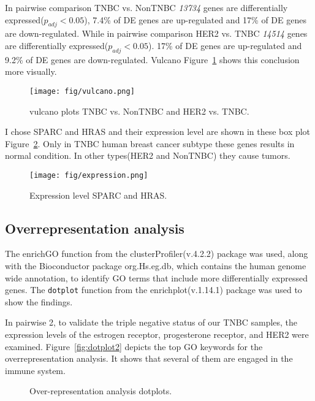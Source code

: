 \documentclass[onecolumn]{article}
\begin{document}
In pairwise comparison TNBC vs. NonTNBC \emph{13734} genes are differentially expressed($p_{adj} < 0.05$), 7.4\% of DE genes are up-regulated and 17\% of DE genes are down-regulated.
While in pairwise comparison HER2 vs. TNBC \emph{14514} genes are differentially expressed($p_{adj} < 0.05$).  17\% of DE genes are up-regulated and 9.2\% of DE genes are down-regulated. Vulcano Figure~\ref{fig:vulcano} shows this conclusion more visually.

\begin{figure}[t]
\centering
    \texttt{[image: fig/vulcano.png]}
\caption{\label{fig:vulcano}
vulcano plots TNBC vs. NonTNBC and HER2 vs. TNBC.}
\end{figure}
 
I chose SPARC and HRAS and their expression level are shown in these box plot Figure~\ref{fig:expres}. Only in TNBC human breast cancer subtype these genes results in normal condition. In other types(HER2 and NonTNBC) they cause tumors.

\begin{figure}[t]
\centering
    \texttt{[image: fig/expression.png]}
\caption{\label{fig:expres}
Expression level SPARC and HRAS.}
\end{figure}

\subsection{Overrepresentation analysis}

The enrichGO function from the clusterProfiler(v.4.2.2)\cite{WU2021100141} package was used, along with the Bioconductor package org.Hs.eg.db\cite{org.Hs.eg.db}, which contains the human genome wide annotation, to  identify GO terms that include more differentially expressed genes. The \verb|dotplot| function from the enrichplot(v.1.14.1) package\cite{enrichplot} was used to show the findings.

In pairwise 2, to validate the triple negative status of our TNBC samples, the expression levels of the estrogen receptor, progesterone receptor, and HER2 were examined. Figure~\ref{fig:dotplot2} depicts the top GO keywords for the overrepresentation analysis. It shows that several of them are engaged in the immune system.

\begin{figure}[t]
\centering
{}
\caption{\label{fig:dotplot}
Over-representation analysis dotplots.}
\end{figure}
\end{document}
